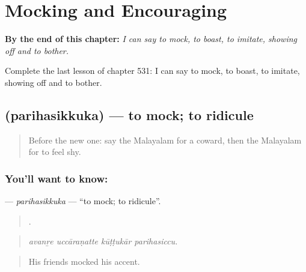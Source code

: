 
\chapter{Mocking and Encouraging}
\label{ch:ml-mocking-and-encouraging}

\begin{chapteropening}
\textbf{By the end of this chapter:} \emph{I can say to mock, to boast, to imitate, showing off and to bother.}

Complete the last lesson of chapter 531: I can say to mock, to boast, to imitate, showing off and to bother.
\end{chapteropening}

\section[\texorpdfstring{\ml{പരിഹസിക്കുക} (parihasikkuka)}{പരിഹസിക്കുക (parihasikkuka)}]{ (parihasikkuka) — to mock; to ridicule}

\label{lesson:ML-C531-parihasikkuka}



\begin{quote}
Before the new one: say the Malayalam for a coward, then the Malayalam for to feel shy.
\end{quote}

\subsection*{You'll want to know: }
\textbf{} — \emph{parihasikkuka} — \textquotedblleft{}to mock; to ridicule\textquotedblright{}.

\begin{quote}
   .
\end{quote}

\begin{quote}
\emph{avanṟe uccāraṇatte kūṭṭukār parihasiccu.}
\end{quote}

\begin{quote}
His friends mocked his accent.
\end{quote}


